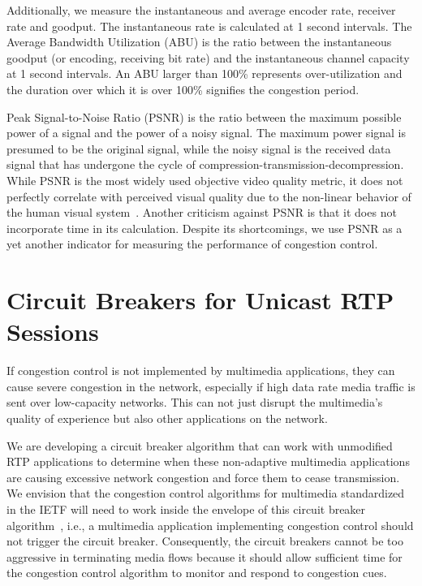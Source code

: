 Additionally, we measure the instantaneous and average encoder rate, receiver
rate and goodput. The instantaneous rate is calculated at 1 second intervals. The
Average Bandwidth Utilization (ABU) is the ratio between the instantaneous
goodput (or encoding, receiving bit rate) and the instantaneous channel
capacity at 1 second intervals. An ABU larger than 100\% represents over-utilization 
and the duration over which it is over 100\% signifies the congestion period.


Peak Signal-to-Noise Ratio (PSNR) is the ratio between the maximum possible
power of a signal and the power of a noisy signal. The maximum power signal is
presumed to be the original signal, while the noisy signal is the received data
signal that has undergone the cycle of compression-transmission-decompression.
While PSNR is the most widely used objective video quality metric, it does not
perfectly correlate with perceived visual quality due to the non-linear
behavior of the human visual system~\cite{itu-t-j247}. Another criticism
against PSNR is that it does not incorporate time in its calculation. Despite
its shortcomings, we use PSNR as a yet another indicator for measuring the
performance of congestion control.



\section{Circuit Breakers for Unicast RTP Sessions}

If congestion control is not implemented by multimedia applications, they can
cause severe congestion in the network, especially if high data rate media
traffic is sent over low-capacity networks. This can not just disrupt the
multimedia's quality of experience but also other applications on the network.

We are developing a circuit breaker algorithm that can work with unmodified
RTP applications to determine when these non-adaptive multimedia
applications are causing excessive network congestion and force them to cease
transmission.  We envision that the congestion control algorithms for
multimedia standardized in the IETF will need to work inside the envelope of
this circuit breaker algorithm~\cite{draft.rmcat.evaluate}, i.e., a multimedia
application implementing congestion control should not trigger the circuit
breaker. Consequently, the circuit breakers cannot be too aggressive in
terminating media flows because it should allow sufficient time for the
congestion control algorithm to monitor and respond to congestion cues.

